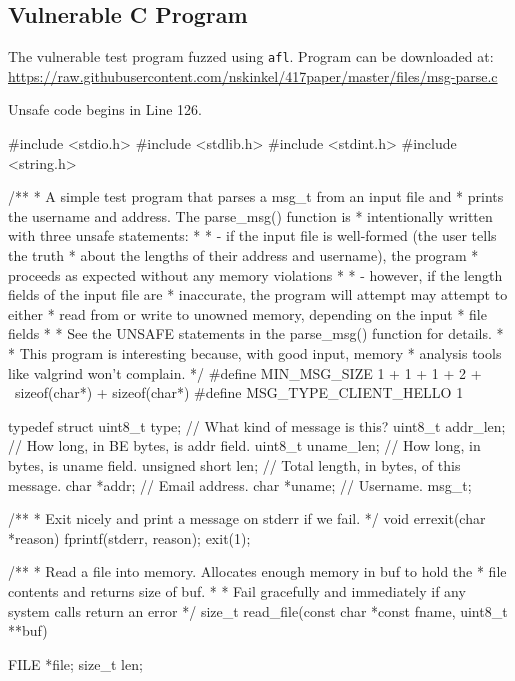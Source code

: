 \begin{appendices}

\chapter{Vulnerable C Program}
\label{app:vuln-full}

The vulnerable test program fuzzed using \texttt{afl}. Program can be
downloaded at: \url{https://raw.githubusercontent.com/nskinkel/417paper/master/files/msg-parse.c}

Unsafe code begins in Line 126.

\renewcommand\mylstcaption{Vulnerable Test Program}
\begin{TCBlisting}[language={[ANSI]C},basicstyle=\scriptsize,caption={\mylstcaption}]
#include <stdio.h>
#include <stdlib.h>
#include <stdint.h>
#include <string.h>

/**
 * A simple test program that parses a msg_t from an input file and 
 * prints the username and address. The parse_msg() function is
 * intentionally written with three unsafe statements:
 *
 *     - if the input file is well-formed (the user tells the truth
 *       about the lengths of their address and username), the program
 *       proceeds as expected without any memory violations
 *
 *     - however, if the length fields of the input file are
 *       inaccurate, the program will attempt may attempt to either
 *       read from or write to unowned memory, depending on the input
 *       file fields
 *
 * See the UNSAFE statements in the parse_msg() function for details.
 *
 * This program is interesting because, with good input, memory
 * analysis tools like valgrind won't complain.
 */
#define MIN_MSG_SIZE 1 + 1 + 1 + 2 + \
                     sizeof(char*) + sizeof(char*)
#define MSG_TYPE_CLIENT_HELLO 1

typedef struct {
    uint8_t type;       // What kind of message is this?
    uint8_t addr_len;   // How long, in BE bytes, is addr field.
    uint8_t uname_len;  // How long, in bytes, is uname field.
    unsigned short len; // Total length, in bytes, of this message.
    char *addr;         // Email address.
    char *uname;        // Username.
} msg_t;

/**
 * Exit nicely and print a message on stderr if we fail.
 */
void
errexit(char *reason) {
    fprintf(stderr, reason);
    exit(1);
}

/**
 * Read a file into memory. Allocates enough memory in buf to hold the
 * file contents and returns size of buf.
 *
 * Fail gracefully and immediately if any system calls return an error
 */
size_t
read_file(const char *const fname, uint8_t **buf) {
   	FILE *file;
	size_t len;

}
\end{TCBlisting}
\end{appendices}

